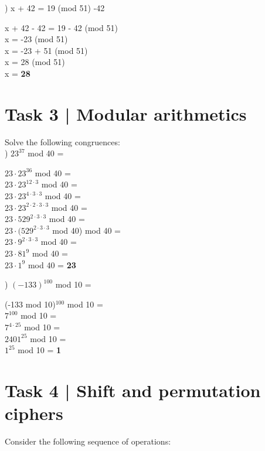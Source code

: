 \documentclass[12pt]{article}
\begin{document}
) x + 42 = 19 (mod 51) \textbar{} -42
\begin{addmargin}[1.22em]{0em}
x + 42 - 42 = 19 - 42 (mod 51) \\
x = -23 (mod 51) \\
x = -23 + 51 (mod 51) \\   
x = 28 (mod 51) \\
x = \textbf{28}
\end{addmargin}


\section*{Task 3 | Modular arithmetics} 

Solve the following congruences: \\

) $23^{37}$ mod 40 = 
\begin{addmargin}[1.22em]{0em}
$23 \cdot 23^{36}$ mod 40 = \\
$23 \cdot 23^{12\cdot3}$ mod 40 = \\
$23 \cdot 23^{4\cdot3\cdot3}$ mod 40 = \\
$23 \cdot 23^{2\cdot2\cdot3\cdot3}$ mod 40 = \\
$23 \cdot 529^{2\cdot3\cdot3}$ mod 40 = \\
$23 \cdot (529^{2\cdot3\cdot3}$ mod 40) mod 40 = \\
$23 \cdot 9^{2\cdot3\cdot3}$ mod 40 = \\
$23 \cdot 81^9$ mod 40 = \\
$23 \cdot 1^9$ mod 40 = 
\textbf{23}
\end{addmargin}

\pagebreak

) $(-133)^{100}$ mod 10 = 
\begin{addmargin}[1.22em]{0em}
(-133 mod 10)$^{100}$ mod 10 = \\
$7^{100}$ mod 10 = \\
$7^{4 \cdot 25}$ mod 10 = \\
$2401^{25}$ mod 10 = \\
$1^{25}$ mod 10 = 
\textbf{1}
\end{addmargin}

\section*{Task 4 | Shift and permutation ciphers}

Consider the following sequence of operations: 
\\
\end{document}
